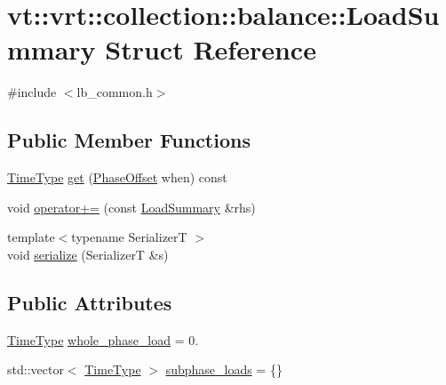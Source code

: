\hypertarget{structvt_1_1vrt_1_1collection_1_1balance_1_1_load_summary}{}\section{vt\+:\+:vrt\+:\+:collection\+:\+:balance\+:\+:Load\+Summary Struct Reference}
\label{structvt_1_1vrt_1_1collection_1_1balance_1_1_load_summary}


{\ttfamily \#include $<$lb\+\_\+common.\+h$>$}

\subsection*{Public Member Functions}
\begin{DoxyCompactItemize}
\item 
\hyperlink{namespacevt_a876a9d0cd5a952859c72de8a46881442}{Time\+Type} \hyperlink{structvt_1_1vrt_1_1collection_1_1balance_1_1_load_summary_a40d8b94c7c0231d5ebe8c60ceb90f251}{get} (\hyperlink{structvt_1_1vrt_1_1collection_1_1balance_1_1_phase_offset}{Phase\+Offset} when) const
\item 
void \hyperlink{structvt_1_1vrt_1_1collection_1_1balance_1_1_load_summary_a3909dd1fbd0725b2bbd591e7a631efe6}{operator+=} (const \hyperlink{structvt_1_1vrt_1_1collection_1_1balance_1_1_load_summary}{Load\+Summary} \&rhs)
\item 
{\footnotesize template$<$typename SerializerT $>$ }\\void \hyperlink{structvt_1_1vrt_1_1collection_1_1balance_1_1_load_summary_af7c5e250fa9359bed76206a6a355c0df}{serialize} (SerializerT \&s)
\end{DoxyCompactItemize}
\subsection*{Public Attributes}
\begin{DoxyCompactItemize}
\item 
\hyperlink{namespacevt_a876a9d0cd5a952859c72de8a46881442}{Time\+Type} \hyperlink{structvt_1_1vrt_1_1collection_1_1balance_1_1_load_summary_aebd92c5a080a326b3ecb6a78a43dcb18}{whole\+\_\+phase\+\_\+load} = 0.
\item 
std\+::vector$<$ \hyperlink{namespacevt_a876a9d0cd5a952859c72de8a46881442}{Time\+Type} $>$ \hyperlink{structvt_1_1vrt_1_1collection_1_1balance_1_1_load_summary_ad26ab5db6aaf53e5f337382620d0a361}{subphase\+\_\+loads} = \{\}
\end{DoxyCompactItemize}


